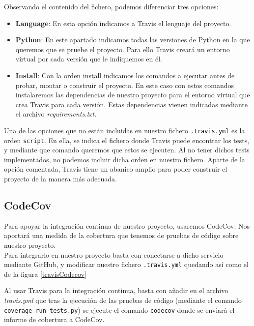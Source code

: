 Observando el contenido del fichero, podemos diferenciar tres opciones:
\begin{itemize}
    \item \textbf{Language}: En esta opción indicamos a Travis el lenguaje del proyecto.
    \item \textbf{Python}: En este apartado indicamos todas las versiones de Python en la que queremos que se pruebe el proyecto. Para ello Travis creará un entorno virtual por cada versión que le indiquemos en él.
    \item \textbf{Install}: Con la orden install indicamos los comandos a ejecutar antes de probar, montar o construir el proyecto. En este caso con estos comandos instalaremos las dependencias de nuestro proyecto para el entorno virtual que crea Travis para cada versión. Estas dependencias vienen indicadas mediante el archivo \textit{requirements.txt}. 
\end{itemize}
Una de las opciones que no están incluidas en nuestro fichero \texttt{.travis.yml} es la orden \texttt{script}. En ella, se indica el fichero donde Travis puede encontrar los tests, y mediante que comando queremos que estos se ejecuten. Al no tener dichos tests implementados, no podemos incluir dicha orden en nuestro fichero. Aparte de la opción comentada, Travis tiene un abanico amplio para poder construir el proyecto de la manera más adecuada.

\subsection*{CodeCov}
\label{subsubsec:CodeCov}
Para apoyar la integración continua de nuestro proyecto, usaremos CodeCov. Nos aportará una medida de la cobertura que tenemos de pruebas de código sobre nuestro proyecto. \\
Para integrarlo en nuestro proyecto basta con conectarse a dicho servicio mediante GitHub, y modificar nuestro fichero \texttt{.travis.yml} quedando así como el de la figura \ref{travisCodecov}

Al usar Travis para la integración continua, basta con añadir en el archivo  \textit{travis.yml} que tras la ejecución de las pruebas de código (mediante el comando \texttt{coverage run tests.py}) se ejecute el comando \texttt{codecov} donde se enviará el informe de cobertura a CodeCov. 

